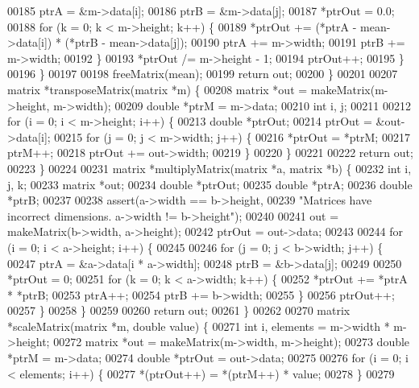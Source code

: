 \begin{DoxyCode}
{{00185       ptrA = &m->data[i];
00186       ptrB = &m->data[j];
00187       *ptrOut = 0.0;
00188       \textcolor{keywordflow}{for} (k = 0; k < m->height; k++) \{
00189         *ptrOut += (*ptrA - mean->data[i]) * (*ptrB - mean->data[j]);
00190         ptrA += m->width;
00191         ptrB += m->width;
00192       \}
00193       *ptrOut /= m->height - 1;
00194       ptrOut++;
00195     \}
00196   \}
00197 
00198   freeMatrix(mean);
00199   \textcolor{keywordflow}{return} out;
00200 \}
00201 
00207 matrix *transposeMatrix(matrix *m) \{
00208   matrix *out = makeMatrix(m->height, m->width);
00209   \textcolor{keywordtype}{double} *ptrM = m->data;
00210   \textcolor{keywordtype}{int} i, j;
00211 
00212   \textcolor{keywordflow}{for} (i = 0; i < m->height; i++) \{
00213     \textcolor{keywordtype}{double} *ptrOut;
00214     ptrOut = &out->data[i];
00215     \textcolor{keywordflow}{for} (j = 0; j < m->width; j++) \{
00216       *ptrOut = *ptrM;
00217       ptrM++;
00218       ptrOut += out->width;
00219     \}
00220   \}
00221 
00222   \textcolor{keywordflow}{return} out;
00223 \}
00224 
00231 matrix *multiplyMatrix(matrix *a, matrix *b) \{
00232   \textcolor{keywordtype}{int} i, j, k;
00233   matrix *out;
00234   \textcolor{keywordtype}{double} *ptrOut;
00235   \textcolor{keywordtype}{double} *ptrA;
00236   \textcolor{keywordtype}{double} *ptrB;
00237 
00238   assert(a->width == b->height,
00239          \textcolor{stringliteral}{"Matrices have incorrect dimensions. a->width != b->height"});
00240 
00241   out = makeMatrix(b->width, a->height);
00242   ptrOut = out->data;
00243 
00244   \textcolor{keywordflow}{for} (i = 0; i < a->height; i++) \{
00245 
00246     \textcolor{keywordflow}{for} (j = 0; j < b->width; j++) \{
00247       ptrA = &a->data[i * a->width];
00248       ptrB = &b->data[j];
00249 
00250       *ptrOut = 0;
00251       \textcolor{keywordflow}{for} (k = 0; k < a->width; k++) \{
00252         *ptrOut += *ptrA * *ptrB;
00253         ptrA++;
00254         ptrB += b->width;
00255       \}
00256       ptrOut++;
00257     \}
00258   \}
00259 
00260   \textcolor{keywordflow}{return} out;
00261 \}
00262 
00270 matrix *scaleMatrix(matrix *m, \textcolor{keywordtype}{double} value) \{
00271   \textcolor{keywordtype}{int} i, elements = m->width * m->height;
00272   matrix *out = makeMatrix(m->width, m->height);
00273   \textcolor{keywordtype}{double} *ptrM = m->data;
00274   \textcolor{keywordtype}{double} *ptrOut = out->data;
00275 
00276   \textcolor{keywordflow}{for} (i = 0; i < elements; i++) \{
00277     *(ptrOut++) = *(ptrM++) * value;
00278   \}
00279 
}}
\end{DoxyCode}

